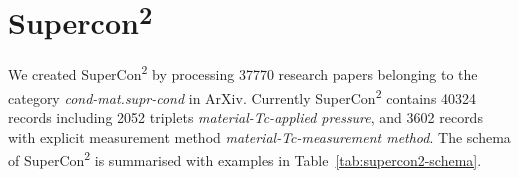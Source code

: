 \documentclass{article}
\begin{document}
\section{Supercon\textsuperscript{2}}

We created SuperCon\textsuperscript{2} by processing 37770 research papers belonging to the category \textit{cond-mat.supr-cond} in ArXiv. 
Currently SuperCon\textsuperscript{2} contains 40324 records including 2052 triplets \textit{material-Tc-applied pressure}, and 3602 records with explicit measurement method \textit{material-Tc-measurement method}.
The schema of SuperCon\textsuperscript{2} is summarised with examples in Table~\ref{tab:supercon2-schema}. 
\end{document}
